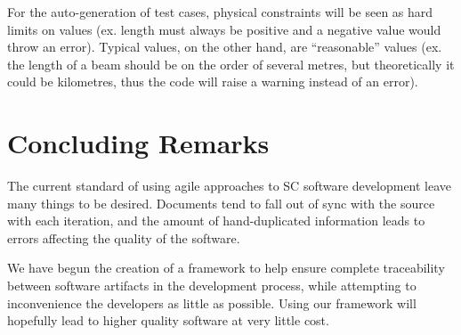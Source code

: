 \documentclass{sig-alternate-05-2015}
\begin{document}
For the auto-generation of test cases, physical constraints will be seen as hard
limits on values (ex. length must always be positive and a negative value would
throw an error). Typical values, on the other hand, are ``reasonable'' values
(ex. the length of a beam should be on the order of several metres, but
theoretically it could be kilometres, thus the code will raise a warning instead
of an error).

    
\section{Concluding Remarks} \label{sec:conclusion}

The current standard of using agile approaches to SC software development leave
many things to be desired. Documents tend to fall out of sync with the source
with each iteration, and the amount of hand-duplicated information leads to
errors affecting the quality of the software.

We have begun the creation of a framework to help ensure complete traceability
between software artifacts in the development process, while attempting to
inconvenience the developers as little as possible. Using our framework will
hopefully lead to higher quality software at very little cost.


  
\end{document}
